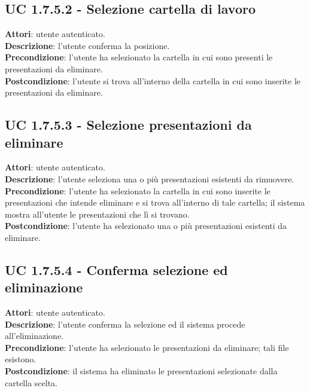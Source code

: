 		\subsection{UC 1.7.5.2 - Selezione cartella di lavoro}{
			\label{uc1.7.5.2}
			\textbf{Attori}: utente autenticato. \\
			\textbf{Descrizione}: l'utente conferma la posizione. \\
			\textbf{Precondizione}: l'utente ha selezionato la cartella in cui sono presenti le presentazioni da eliminare.	\\
			\textbf{Postcondizione}: l'utente si trova all'interno della cartella in cui sono inserite le presentazioni da eliminare. 	\\
			}
		\subsection{UC 1.7.5.3 - Selezione presentazioni da eliminare}{
			\label{uc1.7.5.3}
			\textbf{Attori}: utente autenticato. \\
			\textbf{Descrizione}: l'utente seleziona una o più presentazioni esistenti da rimuovere. \\
			\textbf{Precondizione}: l'utente ha selezionato la cartella in cui sono  inserite le presentazioni che intende eliminare e si trova all'interno di tale cartella; il sistema mostra all'utente le presentazioni che lì si trovano.	\\
			\textbf{Postcondizione}: l'utente ha selezionato una o più presentazioni esistenti da eliminare.	\\
			}
		\subsection{UC 1.7.5.4 - Conferma selezione ed eliminazione}{
			\label{uc1.7.5.4}
			\textbf{Attori}: utente autenticato. \\
			\textbf{Descrizione}: l'utente conferma la selezione ed il sistema procede all'eliminazione. \\
			\textbf{Precondizione}: l'utente ha selezionato le presentazioni da eliminare; tali file esistono.	\\
			\textbf{Postcondizione}: il sistema ha eliminato le presentazioni selezionate dalla cartella scelta.	\\
			}
